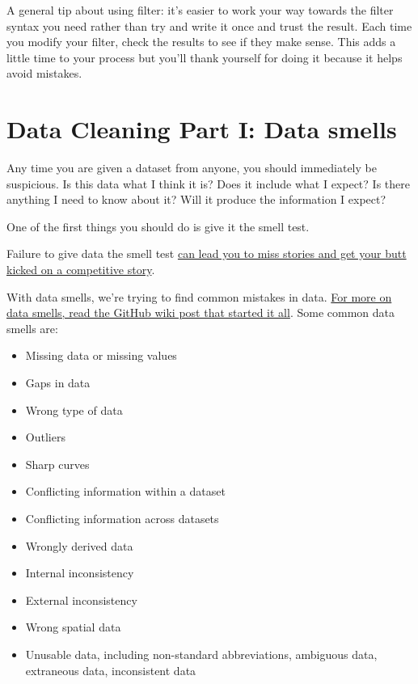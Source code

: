 \documentclass[
  letterpaper,
  DIV=11,
  numbers=noendperiod]{scrreprt}
\providecommand{\tightlist}{%
  \setlength{\itemsep}{0pt}\setlength{\parskip}{0pt}}\usepackage{longtable,booktabs,array}
\begin{document}
A general tip about using filter: it's easier to work your way towards
the filter syntax you need rather than try and write it once and trust
the result. Each time you modify your filter, check the results to see
if they make sense. This adds a little time to your process but you'll
thank yourself for doing it because it helps avoid mistakes.


\hypertarget{data-cleaning-part-i-data-smells}{%
\chapter{Data Cleaning Part I: Data
smells}\label{data-cleaning-part-i-data-smells}}

Any time you are given a dataset from anyone, you should immediately be
suspicious. Is this data what I think it is? Does it include what I
expect? Is there anything I need to know about it? Will it produce the
information I expect?

One of the first things you should do is give it the smell test.

Failure to give data the smell test
\href{https://source.opennews.org/en-US/learning/handling-data-about-race-and-ethnicity/}{can
lead you to miss stories and get your butt kicked on a competitive
story}.

With data smells, we're trying to find common mistakes in data.
\href{https://github.com/nikeiubel/data-smells/wiki/Ensuring-Accuracy-in-Data-Journalism}{For
more on data smells, read the GitHub wiki post that started it all}.
Some common data smells are:

\begin{itemize}
\tightlist
\item
  Missing data or missing values
\item
  Gaps in data
\item
  Wrong type of data
\item
  Outliers
\item
  Sharp curves
\item
  Conflicting information within a dataset
\item
  Conflicting information across datasets
\item
  Wrongly derived data
\item
  Internal inconsistency
\item
  External inconsistency
\item
  Wrong spatial data
\item
  Unusable data, including non-standard abbreviations, ambiguous data,
  extraneous data, inconsistent data
\end{itemize}
\end{document}
